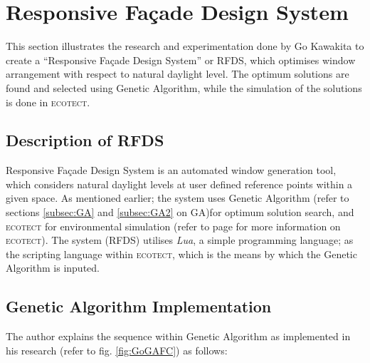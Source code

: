 \clearpage

\section{Responsive Fa\c{c}ade Design System}
\label{sec:RFDS}

This section illustrates the research and experimentation done by Go Kawakita \cite{kawakita08} to create a ``Responsive Fa\c{c}ade Design System'' or RFDS, which optimises window arrangement with respect to natural daylight level. The optimum solutions are found and selected using Genetic Algorithm, while the simulation of the solutions is done in \textsc{ecotect}.

\subsection{Description of RFDS}

Responsive Fa\c{c}ade Design System is an automated window generation tool, which considers natural daylight levels at user defined reference points within a given space. As mentioned earlier; the system uses Genetic Algorithm (refer to sections \ref{subsec:GA} and \ref{subsec:GA2} on GA)for optimum solution search, and \textsc{ecotect} for environmental simulation (refer to page \pageref{par:ECOTECT} for more information on \textsc{ecotect}). The system (RFDS) utilises \emph{Lua}, a simple programming language; as the scripting language within \textsc{ecotect}, which is the means by which the Genetic Algorithm is inputed.

\subsection{Genetic Algorithm Implementation}

The author explains the sequence within Genetic Algorithm as implemented in his research (refer to fig. \ref{fig:GoGAFC}) as follows:

